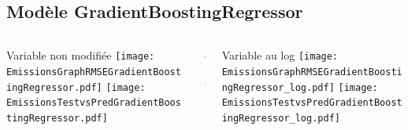 \documentclass[8pt,aspectratio=169,hyperref={unicode=true}]{beamer}
\begin{document}
\subsection{Modèle GradientBoostingRegressor}
\begin{frame}{\insertsubsection}
  \begin{columns}[t]
    \begin{column}{.33\textwidth}
      \centering Variable non modifiée
      \texttt{[image: EmissionsGraphRMSEGradientBoostingRegressor.pdf]}
      \texttt{[image: EmissionsTestvsPredGradientBoostingRegressor.pdf]}
    \end{column}
    \begin{column}{.33\textwidth}
      $\Longleftarrow$
      \scriptsize
      {\centering
        }
      

      \normalsize
      $\Longleftarrow$

      \raggedleft{$\Longrightarrow$}
      \scriptsize
      {\centering
        }
      

      \normalsize
      \raggedleft{$\Longrightarrow$}
    \end{column}
    \begin{column}{.33\textwidth}
      \centering Variable au log
      \texttt{[image: EmissionsGraphRMSEGradientBoostingRegressor\_log.pdf]}
      \texttt{[image: EmissionsTestvsPredGradientBoostingRegressor\_log.pdf]}
    \end{column}
  \end{columns}
\end{frame}
\end{document}
